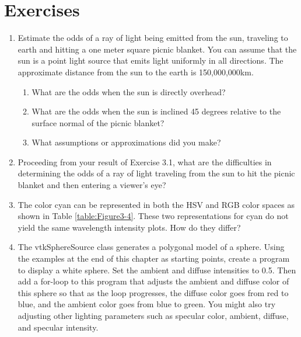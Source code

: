 \section{Exercises}
\begin{enumerate}

\item Estimate the odds of a ray of light being emitted from the sun, traveling to earth and hitting a one meter square picnic blanket. You can assume that the sun is a point light source that emits light uniformly in all directions.
The approximate distance from the sun to the earth is 150,000,000km.

\begin{enumerate}

    \item What are the odds when the sun is directly overhead?

    \item What are the odds when the sun is inclined 45 degrees relative to the surface normal of the picnic blanket?

    \item What assumptions or approximations did you make?

\end{enumerate}

\item Proceeding from your result of Exercise 3.1, what are the difficulties in determining the odds of a ray of light traveling from the sun to hit the picnic blanket and then entering a viewer's eye?

\item The color cyan can be represented in both the HSV and RGB color spaces as shown in Table \ref{table:Figure3-4}. These two representations for cyan do not yield the same wavelength intensity plots. How do they differ?

\item \label{exercise:3.4}The vtkSphereSource class generates a polygonal model of a sphere.
Using the examples at the end of this chapter as starting points, create a program to display a white sphere.
Set the ambient and diffuse intensities to 0.5. Then add a for-loop to this program that adjusts the ambient and diffuse color of this sphere so that as the loop progresses, the diffuse color goes from red to blue, and the ambient color goes from blue to green.
You might also try adjusting other lighting parameters such as specular color, ambient, diffuse, and specular intensity.


\end{enumerate}
